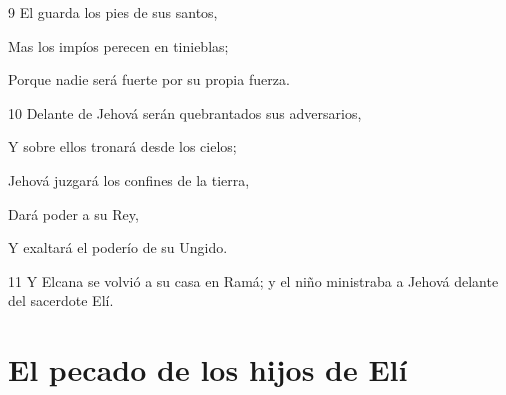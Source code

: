 \par 9 El guarda los pies de sus santos,
\par Mas los impíos perecen en tinieblas;
\par Porque nadie será fuerte por su propia fuerza.
\par 10 Delante de Jehová serán quebrantados sus adversarios,
\par Y sobre ellos tronará desde los cielos;
\par Jehová juzgará los confines de la tierra,
\par Dará poder a su Rey,
\par Y exaltará el poderío de su Ungido. 
\par 11 Y Elcana se volvió a su casa en Ramá; y el niño ministraba a Jehová delante del sacerdote Elí.

\section*{El pecado de los hijos de Elí}

